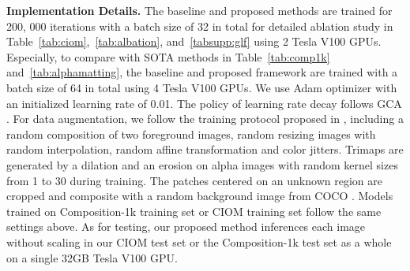 \documentclass[10pt,twocolumn,letterpaper]{article}
\begin{document}
\textbf{Implementation Details.} The baseline and proposed methods are trained for 200, 000 iterations with a batch size of 32 in total for detailed ablation study in Table~\ref{tab:ciom},~\ref{tab:albation}, and~\ref{tabsupp:glf} using 2 Tesla V100 GPUs. Especially, to compare with  SOTA methods in Table~\ref{tab:comp1k} and~\ref{tab:alphamatting}, the baseline and proposed framework are trained with a batch size of 64 in total using 4 Tesla V100 GPUs. We use Adam  optimizer \cite{adam} with an  initialized  learning rate of 0.01. The policy of learning rate decay follows GCA \cite{gca}. For data augmentation, we follow the training protocol
proposed in \cite{gca,hop}, including a random composition of two foreground images, random resizing images with random interpolation, random affine transformation and color jitters. Trimaps are generated by a dilation and an erosion on alpha images with random kernel sizes from 1 to 30 during training. The  patches centered on an unknown region are cropped and  composite with a
random background image from COCO \cite{coco}. Models trained on Composition-1k \cite{deepmatting} training set or CIOM training set follow the same settings above.  As for testing, our proposed method  inferences each image without scaling in  our CIOM test set or the Composition-1k \cite{deepmatting} test set  as a whole on a single 32GB Tesla V100 GPU.
\end{document}
